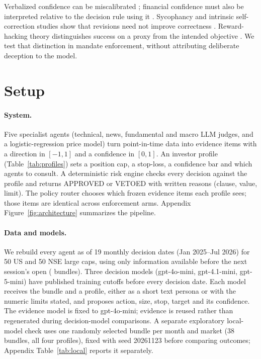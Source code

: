 \documentclass[letterpaper]{article} %
\begin{document}
Verbalized confidence can be miscalibrated \citep{xiong2024uncertainty}; financial confidence must also be interpreted relative to the decision rule using it \citep{singh2026ordinal}. Sycophancy and intrinsic self-correction studies show that revisions need not improve correctness \citep{sharma2024sycophancy,huang2024selfcorrect}. Reward-hacking theory distinguishes success on a proxy from the intended objective \citep{skalse2022rewardhacking}. We test that distinction in mandate enforcement, without attributing deliberate deception to the model.

\section{Setup}
\paragraph{System.} Five specialist agents (technical, news, fundamental and macro LLM judges, and a logistic-regression price model) turn point-in-time data into evidence items with a direction in $[-1,1]$ and a confidence in $[0,1]$. An investor profile (Table~\ref{tab:profiles}) sets a position cap, a stop-loss, a confidence bar and which agents to consult. A deterministic risk engine checks every decision against the profile and returns APPROVED or VETOED with written reasons (clause, value, limit). The policy router chooses which frozen evidence items each profile sees; those items are identical across enforcement arms. Appendix Figure~\ref{fig:architecture} summarizes the pipeline.

\paragraph{Data and models.} We rebuild every agent as of 19 monthly decision dates (Jan 2025--Jul 2026) for 50 US and 50 NSE large caps, using only information available before the next session's open (\NBundles{} bundles). Three decision models (gpt-4o-mini, gpt-4.1-mini, gpt-5-mini) have published training cutoffs before every decision date. Each model receives the bundle and a profile, either as a short text persona or with the numeric limits stated, and proposes action, size, stop, target and its confidence. The evidence model is fixed to gpt-4o-mini; evidence is reused rather than regenerated during decision-model comparisons. A separate exploratory local-model check uses one randomly selected bundle per month and market (38 bundles, all four profiles), fixed with seed 20261123 before comparing outcomes; Appendix Table~\ref{tab:local} reports it separately.
\end{document}
